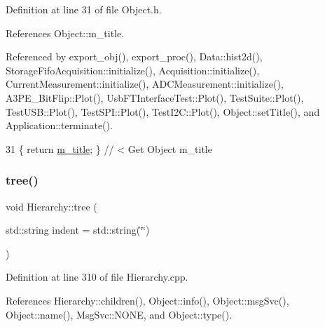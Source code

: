 Definition at line 31 of file Object.\+h.



References Object\+::m\+\_\+title.



Referenced by export\+\_\+obj(), export\+\_\+proc(), Data\+::hist2d(), Storage\+Fifo\+Acquisition\+::initialize(), Acquisition\+::initialize(), Current\+Measurement\+::initialize(), A\+D\+C\+Measurement\+::initialize(), A3\+P\+E\+\_\+\+Bit\+Flip\+::\+Plot(), Usb\+F\+T\+Interface\+Test\+::\+Plot(), Test\+Suite\+::\+Plot(), Test\+U\+S\+B\+::\+Plot(), Test\+S\+P\+I\+::\+Plot(), Test\+I2\+C\+::\+Plot(), Object\+::set\+Title(), and Application\+::terminate().


\begin{DoxyCode}
31 \{ \textcolor{keywordflow}{return} \hyperlink{classObject_affbeea1953eb5163573b92fad8f75727}{m\_title};      \} \textcolor{comment}{// < Get Object m\_title}
\end{DoxyCode}
\mbox{\label{classHierarchy_a76e914b9a677a22a82deb74d892bf261}} 
\subsubsection{\texorpdfstring{tree()}{tree()}\hspace{0.1cm}{\footnotesize\ttfamily [1/2]}}
{\footnotesize\ttfamily void Hierarchy\+::tree (\begin{DoxyParamCaption}\item[{std\+::string}]{indent = {\ttfamily std\+:\+:string(\char`\"{}\char`\"{})} }\end{DoxyParamCaption})\hspace{0.3cm}{\ttfamily [inherited]}}



Definition at line 310 of file Hierarchy.\+cpp.



References Hierarchy\+::children(), Object\+::info(), Object\+::msg\+Svc(), Object\+::name(), Msg\+Svc\+::\+N\+O\+NE, and Object\+::type().


